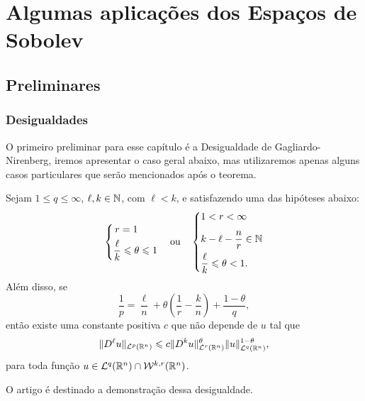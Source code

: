 \chapter{Algumas aplicações dos Espaços de Sobolev} \label{ch:aplicacoes}

\section{Preliminares}
\subsection{Desigualdades}

O primeiro preliminar para esse capítulo é a Desigualdade de Gagliardo-Nirenberg, iremos apresentar o caso geral abaixo, mas utilizaremos apenas alguns casos particulares que serão mencionados após o teorema.
\begin{tbox}
    Sejam $1 \leqslant q \leqslant \infty$, $\ell,k \in \mathbb{N}$, com $\ell < k$, e satisfazendo uma das hipóteses abaixo:
    \[
        \left\{ \begin{aligned}
            &\,r = 1\\
            &\frac{\ell}{k} \leqslant \theta \leqslant 1
        \end{aligned} \right.
        \quad
        \text{ou}
        \quad
        \left\{ \begin{aligned}
            &1 < r < \infty\\[4pt]
            &k - \ell - \frac{n}{r} \in \mathbb{N}\\
            &\frac{\ell}{k} \leqslant \theta < 1.
        \end{aligned} \right.
    \]
    Além disso, se
    \[
        \frac{1}{p} = \frac{\ell}{n} + \theta \left( \frac{1}{r} - \frac{k}{n} \right) + \frac{1 - \theta}{q},
    \]
    então existe uma constante positiva $c$ que não depende de $u$ tal que
    \[
        \Vert D^\ell u \Vert_{\mathcal{L}^p(\mathbb{R}^n)} \leqslant c \Vert D^k u \Vert_{\mathcal{L}^r(\mathbb{R}^n)}^\theta \Vert u \Vert_{\mathcal{L}^q(\mathbb{R}^n)}^{1-\theta},
    \]
    para toda função $u \in \mathcal{L}^q(\mathbb{R}^n) \cap \mathcal{W}^{k,r}(\mathbb{R}^n)$.  
\end{tbox}
\begin{prf}
    O artigo \cite{fiorenza-gns} é destinado a demonstração dessa desigualdade.
\end{prf}

